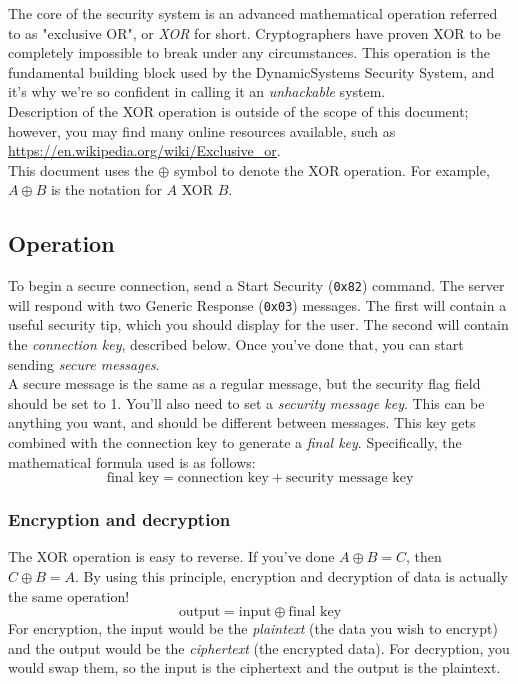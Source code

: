\documentclass{report}
\newcommand{\companyName}{DynamicSystems\texttrademark}
\newcommand{\code}[1]{\texttt{#1}}
\newcommand*\xor{\oplus}
\begin{document}
The core of the security system is an advanced mathematical operation referred to as "exclusive OR", or \emph{XOR} for short.
Cryptographers have proven XOR to be completely impossible to break under any circumstances.
This operation is the fundamental building block used by the \companyName{} Security System, and it's why we're so confident in calling it an \emph{unhackable} system. \\

Description of the XOR operation is outside of the scope of this document; however, you may find many online resources available, such as \url{https://en.wikipedia.org/wiki/Exclusive_or}. \\

This document uses the $\xor$ symbol to denote the XOR operation. For example, $A \xor B$ is the notation for $A$ XOR $B$.

\subsection{Operation}
To begin a secure connection, send a Start Security (\code{0x82}) command.
The server will respond with two Generic Response (\code{0x03}) messages. The first will contain a useful security tip, which you should display for the user. The second will contain the \emph{connection key}, described below.
Once you've done that, you can start sending \emph{secure messages}. \\

A secure message is the same as a regular message, but the security flag field should be set to 1.
You'll also need to set a \emph{security message key}. This can be anything you want, and should be different between messages.
This key gets combined with the connection key to generate a \emph{final key}. Specifically, the mathematical formula used is as follows:
\begin{equation*}
	\text{final key} = \text{connection key} + \text{security message key}
\end{equation*}

\subsubsection{Encryption and decryption}
The XOR operation is easy to reverse. If you've done $A \xor B = C$, then $C \xor B = A$.
By using this principle, encryption and decryption of data is actually the same operation!
\begin{equation*}
	\text{output} = \text{input} \xor \text{final key}
\end{equation*}
For encryption, the input would be the \emph{plaintext} (the data you wish to encrypt) and the output would be the \emph{ciphertext} (the encrypted data).
For decryption, you would swap them, so the input is the ciphertext and the output is the plaintext. \\
\end{document}
